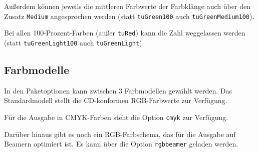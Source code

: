 Außerdem können jeweils die mittleren Farbwerte der Farbklänge auch über den
Zusatz \lstinline{Medium} angesprochen werden (statt \lstinline{tuGreen100} auch
\lstinline{tuGreenMedium100}).

Bei allen 100-Prozent-Farben (außer \lstinline{tuRed}) kann die
Zahl weggelassen werden (statt \lstinline{tuGreenLight100} auch 
\lstinline{tuGreenLight}).

\subsection{Farbmodelle}

In den Paketoptionen kann zwischen 3 Farbmodellen gewählt werden.
Das Standardmodell stellt die CD-konformen RGB-Farbwerte zur Verfügung.

Für die Ausgabe in CMYK-Farben steht die Option \lstinline!cmyk! zur Verfügung.

Darüber hinaus gibt es noch ein RGB-Farbschema, das für die Ausgabe auf
Beamern optimiert ist. Es kann über die Option \lstinline!rgbbeamer! geladen
werden.

